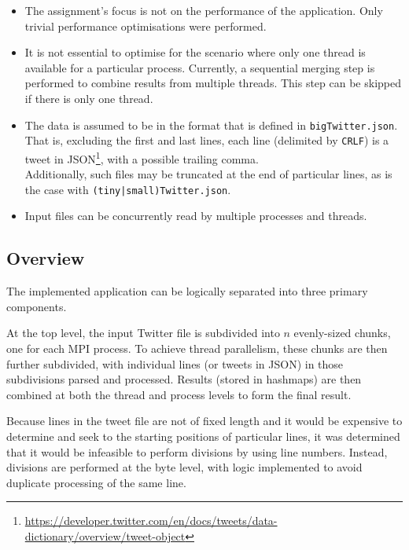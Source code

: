 \documentclass[10pt]{article}
\begin{document}
\begin{itemize}[topsep=2pt]
    \setlength\itemsep{1pt}
   
    \item The assignment's focus is not on the performance of the application.
    Only trivial performance optimisations were performed. 
   
    \item It is not essential to optimise for the scenario where only one thread is available for a particular process. Currently, a sequential merging step is performed to combine results from multiple threads. This step can be skipped if there is only one thread. 

    \item The data is assumed to be in the format that is defined in \texttt{bigTwitter.json}.
    That is, excluding the first and last lines, each line (delimited by \texttt{CRLF}) is a tweet in JSON\footnote{\url{https://developer.twitter.com/en/docs/tweets/data-dictionary/overview/tweet-object}},
    with a possible trailing comma. \\
    Additionally, such files may be truncated at the end of particular lines, as is the case with \texttt{(tiny|small)Twitter.json}. 
    
    \item Input files can be concurrently read by multiple processes and threads.
\end{itemize}


\subsection{Overview}
The implemented application can be logically separated into three primary components. 

At the top level, the input Twitter file is subdivided into $n$ evenly-sized chunks, one for each MPI process. 
To achieve thread parallelism, these chunks are then further subdivided, 
with individual lines (or tweets in JSON) in those subdivisions parsed and processed. %
Results (stored in hashmaps) are then combined at both the thread and process levels to form the final result. 

Because lines in the tweet file are not of fixed length and it would be expensive to determine and seek to the starting positions of particular lines, it was determined that it would be infeasible to perform divisions by using line numbers. Instead, divisions are performed at the byte level, with logic implemented to avoid duplicate processing of the same line. 
\end{document}
